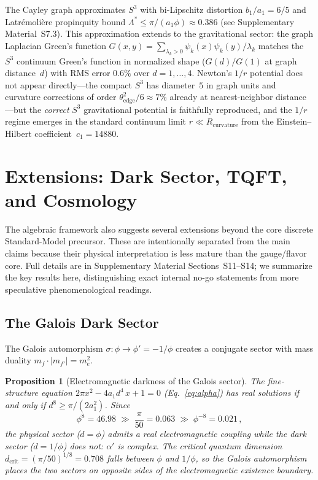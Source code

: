 \documentclass[12pt,a4paper]{article}
\newtheorem{proposition}{Proposition}
\theoremstyle{definition}
\begin{document}
The Cayley graph approximates $S^3$ with bi-Lipschitz distortion $b_1/a_1 = 6/5$ and Latr\'emoli\`ere propinquity bound $\Lambda^* \leq \pi/(a_1\phi) \approx 0.386$ (see Supplementary Material~S7.3).  This approximation extends to the gravitational sector: the graph Laplacian Green's function $G(x,y) = \sum_{\lambda_k > 0} \psi_k(x)\psi_k(y)/\lambda_k$ matches the $S^3$ continuum Green's function in normalized shape ($G(d)/G(1)$ at graph distance~$d$) with RMS error $0.6\%$ over $d = 1, \ldots, 4$.  Newton's $1/r$ potential does not appear directly---the compact $S^3$ has diameter~$5$ in graph units and curvature corrections of order $\theta_{\mathrm{edge}}^2/6 \approx 7\%$ already at nearest-neighbor distance---but the \emph{correct} $S^3$ gravitational potential is faithfully reproduced, and the $1/r$ regime emerges in the standard continuum limit $r \ll R_{\mathrm{curvature}}$ from the Einstein--Hilbert coefficient~$c_1 = 14880$.


\section{Extensions: Dark Sector, TQFT, and Cosmology}
\label{sec:extensions}

The algebraic framework also suggests several extensions beyond the core discrete Standard-Model precursor.  These are intentionally separated from the main claims because their physical interpretation is less mature than the gauge/flavor core.  Full details are in Supplementary Material Sections~S11--S14; we summarize the key results here, distinguishing exact internal no-go statements from more speculative phenomenological readings.

\subsection{The Galois Dark Sector}
\label{sec:dark}

The Galois automorphism $\sigma: \phi \to \phi' = -1/\phi$ creates a conjugate sector with mass duality $m_f \cdot |m_{f'}| = m_e^2$.

\begin{proposition}[Electromagnetic darkness of the Galois sector]
\label{prop:dark_alpha}
The fine-structure equation $2\pi x^2 - 4a_1 d^4\, x + 1 = 0$ (Eq.~\ref{eq:alpha}) has real solutions if and only if $d^8 \geq \pi/(2a_1^2)$.  Since
\[
\phi^8 = 46.98 \;\gg\; \frac{\pi}{50} = 0.063 \;\gg\; \phi^{-8} = 0.021\,,
\]
the physical sector ($d = \phi$) admits a real electromagnetic coupling while the dark sector ($d = 1/\phi$) does not: $\alpha'$ is complex.  The critical quantum dimension $d_{\mathrm{crit}} = (\pi/50)^{1/8} = 0.708$ falls between $\phi$ and $1/\phi$, so the Galois automorphism places the two sectors on opposite sides of the electromagnetic existence boundary.
\end{proposition}
\end{document}
